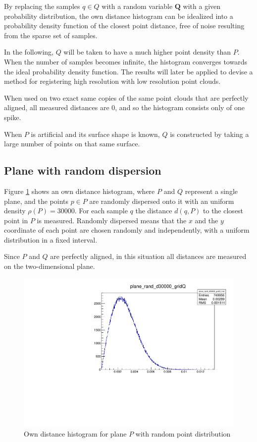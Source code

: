 By replacing the samples $q \in Q$ with a random variable $\textbf{Q}$ with a given probability distribution, the own distance histogram can be idealized into a probability density function of the closest point distance, free of noise resulting from the sparse set of samples.

In the following, $Q$ will be taken to have a much higher point density than $P$. When the number of samples becomes infinite, the histogram converges towards the ideal probability density function. The results will later be applied to devise a method for registering high resolution with low resolution point clouds.

When used on two exact same copies of the same point clouds that are perfectly aligned, all measured distances are $0$, and so the histogram consists only of one spike.

When $P$ is artificial and its surface shape is known, $Q$ is constructed by taking a large number of points on that same surface.

\subsection{Plane with random dispersion}
Figure \ref{fig:plane_rand_d30000} shows an own distance histogram, where $P$ and $Q$ represent a single plane, and the points $p \in P$ are randomly dispersed onto it with an uniform density $\rho(P) = 30000$. For each sample $q$ the distance $d(q, P)$ to the closest point in $P$ is measured. Randomly dispersed means that the $x$ and the $y$ coordinate of each point are chosen randomly and independently, with a uniform distribution in a fixed interval.

Since $P$ and $Q$ are perfectly aligned, in this situation all distances are measured on the two-dimensional plane.

\begin{figure}[H]
\centering
\includegraphics[width=.6\textwidth]{fig/plane_rand_d30000_gridQ.pdf}
\caption{Own distance histogram for plane $P$ with random point distribution}
\label{fig:plane_rand_d30000}
\end{figure}

